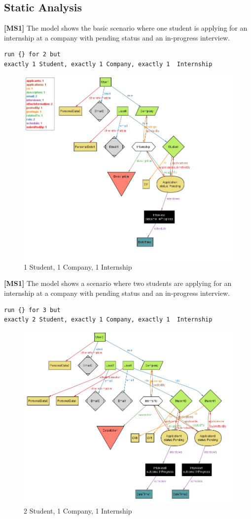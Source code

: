 \subsection{Static Analysis}
\textbf{[MS1]} The model shows the basic scenario where one student is applying for an internship at a company with pending status and an in-progress interview.
\begin{lstlisting}
run {} for 2 but 
exactly 1 Student, exactly 1 Company, exactly 1  Internship
\end{lstlisting}
\begin{figure}[H]
    \centering
    \includegraphics[width=0.75\linewidth]{RASD//Images/1st1com.png}
    \caption{1 Student, 1 Company, 1 Internship}
    \label{fig:enter-label}
\end{figure}

\textbf{[MS1]} The model shows a scenario where two students are applying for an internship at a company with pending status and an in-progress interview.
\begin{lstlisting}
run {} for 3 but 
exactly 2 Student, exactly 1 Company, exactly 1  Internship
\end{lstlisting}
\begin{figure}[H]
    \centering
    \includegraphics[width=1\linewidth]{RASD//Images/2st1com.png}
    \caption{2 Student, 1 Company, 1 Internship}
    \label{fig:enter-label}
\end{figure}

